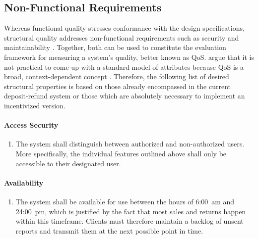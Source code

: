 \subsection{Non-Functional Requirements}
\label{sec:NFRs}
Whereas functional quality stresses conformance with the design specifications, structural quality addresses non-functional requirements such as security and maintainability \cite[p.~2]{Martinez-Ortiz:2016:QMW:3011141.3011203}. Together, both can be used to constitute the evaluation framework for measuring a system's quality, better known as \ac{QoS}. \citeauthor{Liu:2004:QCP:1013367.1013379} argue that it is not practical to come up with a standard model of attributes because \ac{QoS} is a broad, context-dependent concept \cite[p.~67]{Liu:2004:QCP:1013367.1013379}. Therefore, the following list of desired structural properties is based on those already encompassed in the current deposit-refund system or those which are absolutely necessary to implement an incentivized version.

\paragraph{Access Security}
\begin{enumerate}[font=\sffamily, label={\textbf{NFR-\protect\twodigits{\theenumi}}},leftmargin=1.7cm, ref=NFR-\protect\twodigits{\theenumi}]  
	\item The system shall distinguish between authorized and non-authorized users. More specifically, the individual features outlined above shall only be accessible to their designated user.\label{itm:accessSecurity}
\end{enumerate}

\paragraph{Availability}
\begin{enumerate}[resume, font=\sffamily, label={\textbf{NFR-\protect\twodigits{\theenumi}}},leftmargin=1.7cm, ref=NFR-\protect\twodigits{\theenumi}]  
	\item The system shall be available for use between the hours of 6:00~am and 24:00~pm, which is justified by the fact that most sales and returns happen within this timeframe. Clients must therefore maintain a backlog of unsent reports and transmit them at the next possible point in time.\label{itm:operatingTimes}
\end{enumerate}

